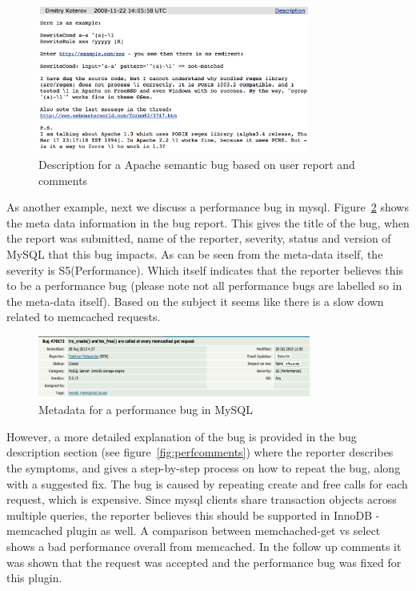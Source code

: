 \begin{figure}[!h]
\begin{center}
\includegraphics[width=0.8\textwidth]{parikshan/figs/comments}
\caption{Description for a Apache semantic bug based on user report and comments}	
\label{fig:semanticcomments}
\end{center}
\end{figure}

As another example, next we discuss a performance bug in mysql. Figure~\ref{fig:mysqlPerfMeta} shows the meta data information in the bug report. This gives the title of the bug, when the report was submitted, name of the reporter, severity, status and version of MySQL that this bug impacts. As can be seen from the meta-data itself, the severity is S5(Performance). Which itself indicates that the reporter believes this to be a performance bug (please note not all performance bugs are labelled so in the meta-data itself). 
Based on the subject it seems like there is a slow down related to memcached requests.  

\begin{figure}[!h]
	\begin{center}
		\includegraphics[width=0.8\textwidth]{parikshan/figs/mysqlmeta}
		\caption{Metadata for a performance bug in MySQL}
		\label{fig:mysqlPerfMeta}
	\end{center}
\end{figure}

However, a more detailed explanation of the bug is provided in the bug description section (see figure~\ref{fig:perfcomments}) where the reporter describes the symptoms, and gives a step-by-step process on how to repeat the bug, along with a suggested fix. The bug is caused by repeating create and free calls for each request, which is expensive. Since mysql clients share transaction objects across multiple queries, the reporter believes this should be supported in InnoDB -memcached plugin as well. A comparison between memchached-get vs select shows a bad performance overall from memcached. In the follow up comments it was shown that the request was accepted and the performance bug was fixed for this plugin. 

